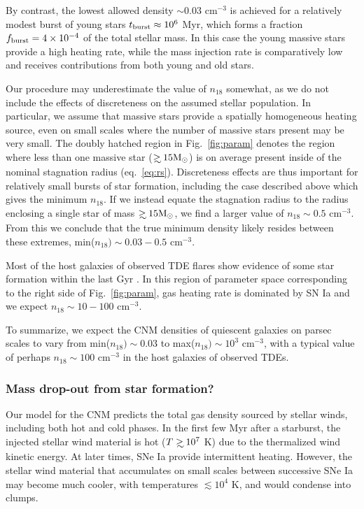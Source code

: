 \documentclass[usenatbib,fleqn]{mnras}
\newcommand\gsim{\mathrel{\rlap{\lower4pt\hbox{\hskip1pt$\sim$}}
    \raise1pt\hbox{$>$}}}
\newcommand{\Msun}{{\rm M_\odot}}
\begin{document}
By contrast, the lowest allowed density $\sim 0.03$ cm$^{-3}$ is
achieved for a relatively modest burst of young stars $t_{\rm burst}
\approx 10^{6}$ Myr, which forms a fraction $f_{\rm burst} = 4\times
10^{-4}$ of the total stellar mass. In this case the young massive
stars provide a high heating rate, while the mass injection rate is
comparatively low and receives contributions from both young and old
stars.

Our procedure may underestimate the value of $n_{18}$ somewhat, as we
do not include the effects of discreteness on the assumed stellar
population.  In particular, we assume that massive stars provide a
spatially homogeneous heating source, even on small scales where the
number of massive stars present may be very small.  The doubly hatched
region in Fig.~\ref{fig:param} denotes the region where less than one
massive star ($\gsim 15 \Msun$) is on average present inside of the
nominal stagnation radius (eq.~\ref{eq:rs}).  Discreteness effects are
thus important for relatively small bursts of star formation,
including the case described above which gives the minimum $n_{18}$.
If we instead equate the stagnation radius to the radius enclosing a
single star of mass $\gsim 15 \Msun$, we find a larger value of
$n_{18}\sim 0.5$ cm$^{-3}$.  From this we conclude that the true
minimum density likely resides between these extremes, min($n_{18})
\sim 0.03-0.5$ cm$^{-3}$.

Most of the host galaxies of observed TDE flares show evidence of some
star formation within the last Gyr \citep{French+2016}.  In this
region of parameter space corresponding to the right side of
Fig.~\ref{fig:param}, gas heating rate is dominated by SN Ia and we
expect $n_{18}\sim 10-100$ cm$^{-3}$.

To summarize, we expect the CNM densities of quiescent galaxies on
parsec scales to vary from min($n_{18}) \sim 0.03$ to max($n_{18})\sim
10^{3}$ cm$^{-3}$, with a typical value of perhaps $n_{18}\sim 100$ cm$^{-3}$
in the host galaxies of observed TDEs.

\subsubsection{Mass drop-out from star formation?}

Our model for the CNM predicts the total gas density sourced by
stellar winds, including both hot and cold phases.  In the first few
Myr after a starburst, the injected stellar wind material is hot
($T\gsim 10^{7}$ K) due to the thermalized wind kinetic energy.
At later times, SNe Ia provide intermittent heating.  However, the stellar wind
material that accumulates on small scales between successive SNe Ia
may become much cooler, with temperatures $\lesssim 10^{4}$ K, and
would condense into clumps.
\end{document}
